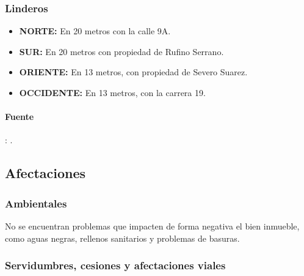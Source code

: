 \documentclass[12pt,a4paper,twoside]{article}
\begin{document}
{\subsubsection{Linderos}

	
\begin{itemize}
	
	\item \textbf{NORTE:} En 20 metros con la calle 9A.\\
	\item \textbf{SUR:} En 20 metros con propiedad de Rufino Serrano. \\
	\item \textbf{ORIENTE:} En 13 metros, con propiedad de Severo Suarez.\\
	\item \textbf{OCCIDENTE:}  En 13 metros, con la carrera 19.\\
\end{itemize}




\paragraph{Fuente}: \EscrituraAportada.


\subsection{Afectaciones}

\subsubsection{Ambientales}

No se encuentran problemas que impacten de forma negativa el bien inmueble, como aguas negras, rellenos sanitarios y problemas de basuras.

\subsubsection{Servidumbres, cesiones y afectaciones viales}

}
\end{document}
